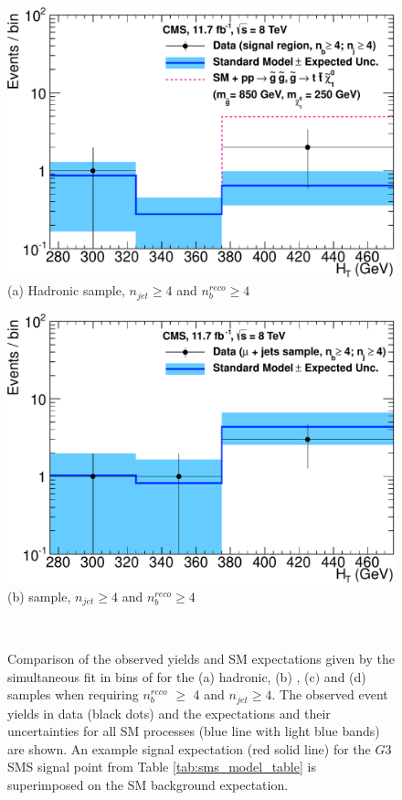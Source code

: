 \begin{figure}[ht]
\footnotesize
\centering
\begin{minipage}[b]{0.48 \linewidth}
\includegraphics[width = 1.0\linewidth]{plots/hadronic_ge4b_ge4j_logy.pdf}
\centering (a)  Hadronic sample, $n_{jet} \geq 4$ and $n_{b}^{reco} \geq 4$ 
\end{minipage}
\quad
\begin{minipage}[b]{0.48\linewidth}
\includegraphics[width = 1.0\linewidth]{plots/muon_ge4b_ge4j_logy.pdf}
\centering (b)  \mupjets sample, $n_{jet} \geq 4$ and $n_{b}^{reco} \geq 4$  
\end{minipage} \\
\caption[Comparison of the observed yields and \ac{SM} expectations given by the simultaneous fit in bins of \theht for the (a) hadronic, (b) \mupjets, (c$)$ \dimupjets and (d) \gpjets samples when requiring $n_{b}^{reco} \geq$  4 and $n_{jet} \geq 4$.]{Comparison of the observed yields and \ac{SM} expectations given by the simultaneous fit in bins of \theht for the (a) hadronic, (b) \mupjets, (c$)$ \dimupjets and (d) \gpjets samples when requiring $n_{b}^{reco}$ $\geq$ 4 and $n_{jet} \geq 4$. The observed event yields in data (black dots) and the expectations and their uncertainties for all SM processes (blue line with light blue bands) are shown. An example signal expectation (red solid line) for the $G3$ \ac{SMS} signal point from Table \ref{tab:sms_model_table} is superimposed on the \ac{SM} background expectation.}
\label{fig:result4bhigh}
\end{figure}


